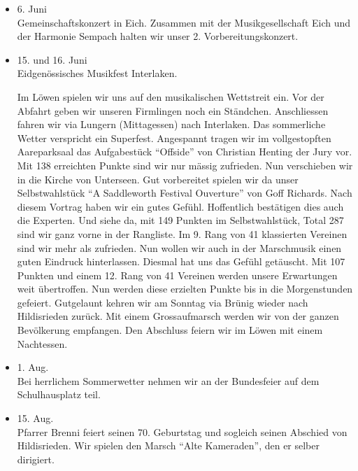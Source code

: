 \begin{history}
\begin{itemize}
        \item 6. Juni\\
              Gemeinschaftskonzert in Eich. Zusammen mit der Musikgesellschaft Eich
              und der Harmonie Sempach halten wir unser 2. Vorbereitungskonzert.

        \item 15. und 16. Juni\\
              Eidgenössisches Musikfest Interlaken.

              Im Löwen spielen wir uns auf den musikalischen Wettstreit ein. Vor der
              Abfahrt geben wir unseren Firmlingen noch ein Ständchen. Anschliessen
              fahren wir via Lungern (Mittagessen) nach Interlaken. Das sommerliche
              Wetter verspricht ein Superfest. Angespannt tragen wir im vollgestopften
              Aareparksaal das Aufgabestück \enquote{Offside} von Christian Henting
              der Jury vor. Mit 138 erreichten Punkte sind wir nur mässig zufrieden.
              Nun verschieben wir in die Kirche von Unterseen. Gut vorbereitet spielen
              wir da unser Selbstwahlstück \enquote{A Saddleworth Festival Ouverture}
              von Goff Richards. Nach diesem Vortrag haben wir ein gutes Gefühl.
              Hoffentlich bestätigen dies auch die Experten. Und siehe da, mit 149
              Punkten im Selbstwahlstück, Total 287 sind wir ganz vorne in der
              Rangliste. Im 9. Rang von 41 klassierten Vereinen sind wir mehr als
              zufrieden. Nun wollen wir auch in der Marschmusik einen guten Eindruck
              hinterlassen. Diesmal hat uns das Gefühl getäuscht. Mit 107 Punkten und
              einem 12. Rang von 41 Vereinen werden unsere Erwartungen weit
              übertroffen. Nun werden diese erzielten Punkte bis in die Morgenstunden
              gefeiert. Gutgelaunt kehren wir am Sonntag via Brünig wieder nach
              Hildisrieden zurück. Mit einem Grossaufmarsch werden wir von der ganzen
              Bevölkerung empfangen. Den Abschluss feiern wir im Löwen mit einem
              Nachtessen.

        \item 1. Aug.\\
              Bei herrlichem Sommerwetter nehmen wir an der Bundesfeier auf dem
              Schulhausplatz teil.

        \item 15. Aug.\\
              Pfarrer Brenni feiert seinen 70. Geburtstag und sogleich seinen Abschied
              von Hildisrieden. Wir spielen den Marsch \enquote{Alte Kameraden}, den
              er selber dirigiert.


\end{itemize}
\end{history}
